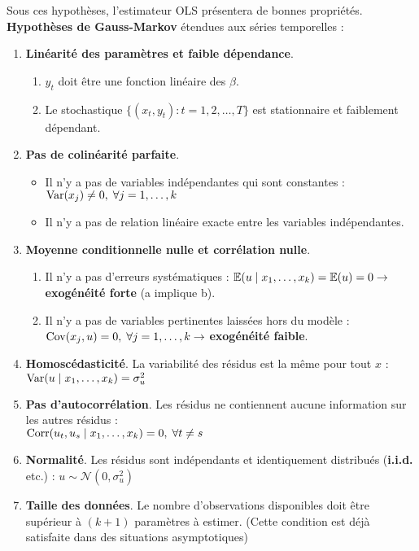  \begin{f}

Sous ces hypothèses, l'estimateur OLS présentera de bonnes propriétés. \textbf{Hypothèses de Gauss-Markov} étendues aux séries temporelles :

\begin{enumerate}[leftmargin=*, label=t\arabic{*}.]
	\item \textbf{Linéarité des paramètres et faible dépendance}.
	
	\begin{enumerate}[leftmargin=*, label=\alph{*}.]
		\item \(y_{t}\) doit être une fonction linéaire des \(\beta\).
		\item Le stochastique \(\lbrace( x_{t}, y_{t}) : t = 1, 2, \ldots, T \rbrace\) est stationnaire et faiblement dépendant.
	\end{enumerate}
	
	\item \textbf{Pas de colinéarité parfaite}.
	
	\begin{itemize}[leftmargin=*]
		\item Il n'y a pas de variables indépendantes qui sont constantes : \(\mathrm{Var}(x_{j}) \neq 0, \; \forall j = 1, \ldots, k\)
		\item Il n'y a pas de relation linéaire exacte entre les variables indépendantes.
	\end{itemize}
	
	\item \textbf{Moyenne conditionnelle nulle et corrélation nulle}.
	
	\begin{enumerate}[leftmargin=*, label=\alph{*}.]
		\item Il n'y a pas d'erreurs systématiques : \(\mathbb{E}(u \mid x_{1}, \ldots, x_{k}) = \mathbb{E}(u) = 0 \rightarrow\) \textbf{exogénéité forte} (a implique b).
		\item Il n'y a pas de variables pertinentes laissées hors du modèle : \(\mathrm{Cov}(x_{j} , u) = 0, \; \forall j = 1, \ldots, k \rightarrow\) \textbf{exogénéité faible}.
	\end{enumerate}
	
	\item \textbf{Homoscédasticité}. La variabilité des résidus est la même pour tout \(x\) : \(\mathrm{Var}(u \mid x_{1}, \ldots, x_{k}) = \sigma^{2}_{u}\)
	\item \textbf{Pas d'autocorrélation}. Les résidus ne contiennent aucune information sur les autres résidus : \\
	\(\mathrm{Corr}(u_{t}, u_{s} \mid x_{1}, \ldots, x_{k}) = 0, \; \forall t \neq s\)
	\item \textbf{Normalité}. Les résidus sont indépendants et identiquement distribués (\textbf{i.i.d.} etc.) : \(u \sim \mathcal{N}(0, \sigma^{2}_{u})\)
	\item \textbf{Taille des données}. Le nombre d'observations disponibles doit être supérieur à \((k + 1)\) paramètres à estimer. (Cette condition est déjà satisfaite dans des situations asymptotiques)
\end{enumerate}


\end{f}
